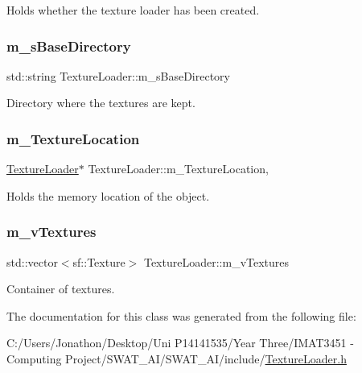 Holds whether the texture loader has been created. 

\mbox{\label{class_texture_loader_ac5b4056169e4b006bfb98a1555365697}} 
\subsubsection{\texorpdfstring{m\+\_\+s\+Base\+Directory}{m\_sBaseDirectory}}
{\footnotesize\ttfamily std\+::string Texture\+Loader\+::m\+\_\+s\+Base\+Directory\hspace{0.3cm}{\ttfamily [private]}}



Directory where the textures are kept. 

\mbox{\label{class_texture_loader_af55fbb100f2475a2d698af957bbd599f}} 
\subsubsection{\texorpdfstring{m\+\_\+\+Texture\+Location}{m\_TextureLocation}}
{\footnotesize\ttfamily \hyperlink{class_texture_loader}{Texture\+Loader}$\ast$ Texture\+Loader\+::m\+\_\+\+Texture\+Location\hspace{0.3cm}{\ttfamily [static]}, {\ttfamily [private]}}



Holds the memory location of the object. 

\mbox{\label{class_texture_loader_ae3323f23889f99c1b7f0fb5c6a2928e9}} 
\subsubsection{\texorpdfstring{m\+\_\+v\+Textures}{m\_vTextures}}
{\footnotesize\ttfamily std\+::vector$<$sf\+::\+Texture$>$ Texture\+Loader\+::m\+\_\+v\+Textures\hspace{0.3cm}{\ttfamily [private]}}



Container of textures. 



The documentation for this class was generated from the following file\+:\begin{DoxyCompactItemize}
\item 
C\+:/\+Users/\+Jonathon/\+Desktop/\+Uni P14141535/\+Year Three/\+I\+M\+A\+T3451 -\/ Computing Project/\+S\+W\+A\+T\+\_\+\+A\+I/\+S\+W\+A\+T\+\_\+\+A\+I/include/\hyperlink{_texture_loader_8h}{Texture\+Loader.\+h}\end{DoxyCompactItemize}
